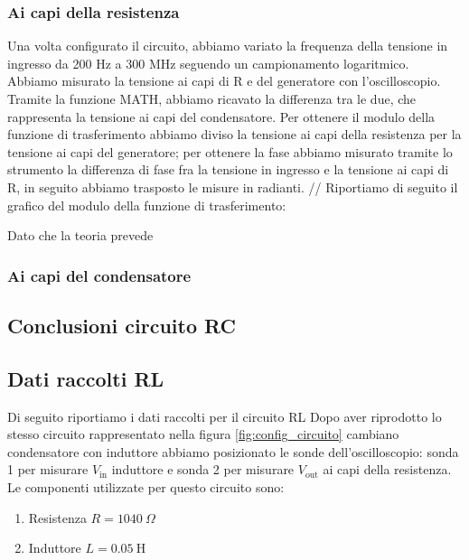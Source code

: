 \documentclass[letterpaper,12pt]{article}
\begin{document}
\subsubsection{Ai capi della resistenza}

Una volta configurato il circuito, abbiamo variato la frequenza della tensione in ingresso da 200 Hz a 300 MHz seguendo un campionamento logaritmico.
Abbiamo misurato la tensione ai capi di R e del generatore con l'oscilloscopio. Tramite la funzione MATH, abbiamo ricavato la differenza tra le due, che rappresenta la tensione ai capi del condensatore. Per ottenere il modulo della funzione di trasferimento abbiamo diviso la tensione ai capi della resistenza per la tensione ai capi del generatore; per ottenere la fase abbiamo misurato tramite lo strumento la differenza di fase fra la tensione in ingresso e la tensione ai capi di R, in seguito abbiamo trasposto le misure in radianti. //
Riportiamo di seguito il grafico del modulo della funzione di trasferimento:


Dato che la teoria prevede


\subsubsection{Ai capi del condensatore}


\subsection{Conclusioni circuito RC}


\subsection{Dati raccolti RL}
Di seguito riportiamo i dati raccolti per il circuito RL Dopo aver riprodotto lo stesso circuito rappresentato nella figura \ref{fig:config_circuito} cambiano condensatore con induttore abbiamo posizionato le sonde dell'oscilloscopio: sonda 1 per misurare $V_\text{in}$ induttore e sonda 2 per misurare $V_\text{out}$ ai capi della resistenza. Le componenti utilizzate per questo circuito sono:

\begin{enumerate}
	\item Resistenza $R = 1040\ \Omega$
	\item Induttore $L = 0.05\ \text{H}$
\end{enumerate}
\end{document}

